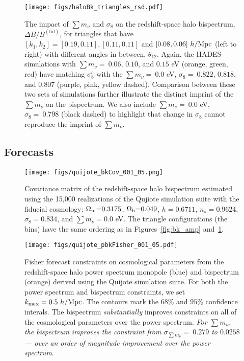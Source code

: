 \documentclass[12pt, letterpaper, preprint]{aastex62}
\newcommand{\Om}{\Omega_{\rm m}}
\newcommand{\Ob}{\Omega_{\rm b}}
\newcommand{\smnu}{\sum m_\nu}
\newcommand{\sig}{\sigma_8}
\begin{document}
\begin{figure}
\begin{center}
\texttt{[image: figs/haloBk\_triangles\_rsd.pdf]}
    \caption{The impact of $\smnu$ and $\sig$ on the redshift-space halo 
    bispectrum, $\Delta B/B^\mathrm{(fid)}$, for triangles that have  
    $[k_1, k_2] = [0.19, 0.11], [0.11, 0.11]$ and $[0.08, 0.06]~h/{\rm Mpc}$ 
    (left to right) with different angles in between, $\theta_{12}$. Again, 
    the HADES simulations with $\smnu{=}~0.06$, $0.10$, and $0.15$ eV 
    (orange, green, red) have matching $\sig^{c}$ with the $\smnu{=}~0.0$ eV, 
    $\sig{=}~0.822$, $0.818$, and $0.807$ (purple, pink, yellow dashed). Comparison
    between  these two sets of simulations further illustrate the distinct 
    imprint of the $\smnu$ on the bispectrum. We also include $\smnu{=}~0.0$ eV, 
    $\sig{=}~0.798$ (black dashed) to highlight that change in $\sig$ cannot 
    reproduce the imprint of $\smnu$. 
    }
\label{fig:dbk_amp}
\end{center}
\end{figure}

\subsection{Forecasts} \label{sec:forecasts}

\begin{figure}
\begin{center}
    \texttt{[image: figs/quijote\_bkCov\_001\_05.png]} 
    \caption{Covariance matrix of the redshift-space halo bispectrum estimated 
    using the 15,000 realizations of the Qujiote simulation suite with the 
    fiducial cosmology: $\Om{=}0.3175$, $\Ob{=}0.049$, $h{=}0.6711$, $n_s{=}0.9624$, $\sig{=}0.834$, 
    and $\smnu{=}0.0$ eV. The triangle configurations (the bins) have the same 
    ordering as in Figures~\ref{fig:bk_amp} and~\ref{fig:dbk_amp}.
    }
\label{fig:bk_cov}
\end{center}
\end{figure}

\begin{figure}
\begin{center}
    \texttt{[image: figs/quijote\_pbkFisher\_001\_05.pdf]}
    \caption{Fisher forecast constraints on cosmological parameters from the 
    redshift-space halo power spectrum monopole (blue) and bispectrum (orange) 
    derived using the Quijote simulation suite. For both the power spectrum 
    and bispectrum constraints, we set $k_{\rm max} = 0.5~h/{\rm Mpc}$. The 
    contours mark the $68\%$ and $95\%$ confidence interals. The bispectrum 
    {\em substantially} improves constraints on all of the cosmological parameters 
    over the power spectrum. {\em For $\smnu$, the bispectrum improves the constraint
    from $\sigma_{\smnu}{=}~0.279$ to $0.0258$ --- over an order of magnitude 
    improvement over the power spectrum}.}
\label{fig:bk_fish}
\end{center}
\end{figure}
\end{document}
